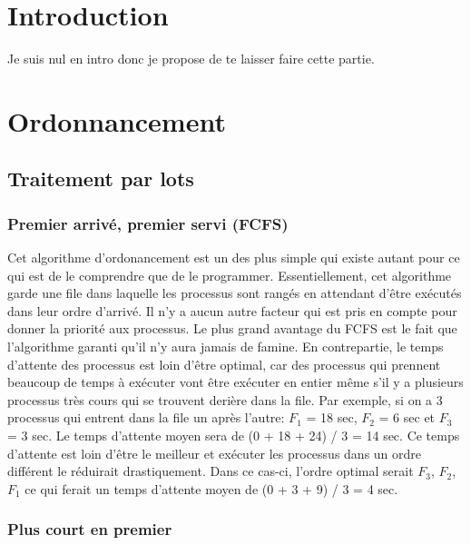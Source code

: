 \documentclass{article}
\begin{document}
\section{Introduction}
Je suis nul en intro donc je propose de te laisser faire cette partie. 


\section{Ordonnancement}

\subsection{Traitement par lots}
\subsubsection{Premier arrivé, premier servi (FCFS)}
Cet algorithme d'ordonancement est un des plus simple qui existe autant pour ce qui est de le comprendre que de le programmer. Essentiellement, cet algorithme garde une file dans laquelle les processus sont rangés en attendant d'être exécutés dans leur ordre d'arrivé. Il n'y a aucun autre facteur qui est pris en compte pour donner la priorité aux processus. Le plus grand avantage du FCFS est le fait que l'algorithme garanti qu'il n'y aura jamais de famine. En contrepartie, le temps d'attente des processus est loin d'être optimal, car des processus qui prennent beaucoup de temps à exécuter vont être exécuter en entier même s'il y a plusieurs processus très cours qui se trouvent derière dans la file. 
\newline
\newline
Par exemple, si on a 3 processus qui entrent dans la file un après l'autre:  $F_1$ = 18 sec, $F_2$ = 6 sec et $F_3$ = 3 sec. Le temps d'attente moyen sera de (0 + 18 + 24) / 3 = 14 sec. Ce temps d'attente est loin d'être le meilleur et exécuter les processus dans un ordre différent le réduirait drastiquement. Dans ce cas-ci, l'ordre optimal serait $F_3$, $F_2$, $F_1$ ce qui ferait un temps d'attente moyen de (0 + 3 + 9) / 3 = 4 sec.

\subsubsection{Plus court en premier}
\end{document}
